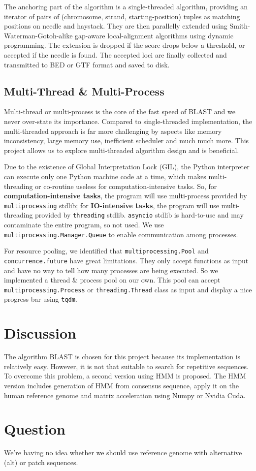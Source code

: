 \documentclass[9pt,final,journal,twocolumn,a4paper]{IEEEtran}
\begin{document}
The anchoring part of the algorithm is a single-threaded algorithm, providing an iterator of pairs of (chromosome, strand, starting-position) tuples as matching positions on needle and haystack. They are then parallelly extended using Smith-Waterman-Gotoh-alike gap-aware local-alignment algorithms using dynamic programming. The extension is dropped if the score drops below a threshold, or accepted if the needle is found. The accepted loci are finally collected and transmitted to BED or GTF format and saved to disk.

\subsection{Multi-Thread \& Multi-Process}

Multi-thread or multi-process is the core of the fast speed of BLAST and we never over-state its importance. Compared to single-threaded implementation, the multi-threaded approach is far more challenging by aspects like memory inconsistency, large memory use, inefficient scheduler and much much more. This project allows us to explore multi-threaded algorithm design and is beneficial.

Due to the existence of Global Interpretation Lock (GIL), the Python interpreter can execute only one Python machine code at a time, which makes multi-threading or co-routine useless for computation-intensive tasks. So, for \textbf{computation-intensive tasks}, the program will use multi-process provided by \verb|multiprocessing| stdlib; for \textbf{IO-intensive tasks}, the program will use multi-threading provided by \verb|threading| stdlib. \verb|asyncio| stdlib is hard-to-use and may contaminate the entire program, so not used. We use \verb|multiprocessing.Manager.Queue| to enable communication among processes.

For resource pooling, we identified that \verb|multiprocessing.Pool| and \verb|concurrence.future| have great limitations. They only accept functions as input and have no way to tell how many processes are being executed. So we implemented a thread \& process pool on our own. This pool can accept \verb|multiprocessing.Process| or \verb|threading.Thread| class as input and display a nice progress bar using \verb|tqdm|.

\section{Discussion}

The algorithm BLAST is chosen for this project because its implementation is relatively easy. However, it is not that suitable to search for repetitive sequences. To overcome this problem, a second version using HMM is proposed. The HMM version includes generation of HMM from consensus sequence, apply it on the human reference genome and matrix acceleration using Numpy or Nvidia Cuda.

\section{Question}

We're having no idea whether we should use reference genome with alternative (alt) or patch sequences.
\end{document}
